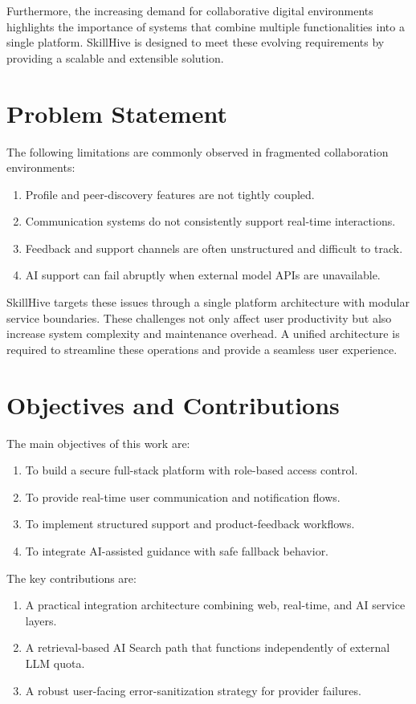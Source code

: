 \documentclass[conference]{IEEEtran}
\begin{document}
Furthermore, the increasing demand for collaborative digital environments highlights the importance of systems that combine multiple functionalities into a single platform. SkillHive is designed to meet these evolving requirements by providing a scalable and extensible solution.

\section{Problem Statement}
The following limitations are commonly observed in fragmented collaboration environments:
\begin{enumerate}
\item Profile and peer-discovery features are not tightly coupled.
\item Communication systems do not consistently support real-time interactions.
\item Feedback and support channels are often unstructured and difficult to track.
\item AI support can fail abruptly when external model APIs are unavailable.
\end{enumerate}

SkillHive targets these issues through a single platform architecture with modular service boundaries. These challenges not only affect user productivity but also increase system complexity and maintenance overhead. A unified architecture is required to streamline these operations and provide a seamless user experience.

\section{Objectives and Contributions}
The main objectives of this work are:
\begin{enumerate}
\item To build a secure full-stack platform with role-based access control.
\item To provide real-time user communication and notification flows.
\item To implement structured support and product-feedback workflows.
\item To integrate AI-assisted guidance with safe fallback behavior.
\end{enumerate}

The key contributions are:
\begin{enumerate}
\item A practical integration architecture combining web, real-time, and AI service layers.
\item A retrieval-based AI Search path that functions independently of external LLM quota.
\item A robust user-facing error-sanitization strategy for provider failures.
\end{enumerate}
\end{document}
